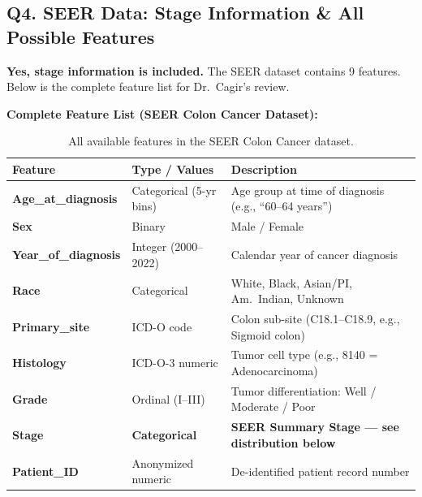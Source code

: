 \documentclass[11pt, a4paper]{article}
\begin{document}
\vspace{6pt}

\subsection*{Q4. SEER Data: Stage Information \& All Possible Features}
\begin{answerbox}
\textbf{Yes, stage information is included.} The SEER dataset contains 9 features. Below is the complete feature list for Dr.\ Cagir's review.
\end{answerbox}

\vspace{6pt}
\noindent\textbf{Complete Feature List (SEER Colon Cancer Dataset):}
\vspace{4pt}

\begin{table}[H]
\centering
\renewcommand{\arraystretch}{1.3}
\begin{tabular}{>{\bfseries}p{4.5cm} p{4.5cm} p{5.5cm}}
\toprule
\textbf{Feature} & \textbf{Type / Values} & \textbf{Description} \\
\midrule
Age\_at\_diagnosis    & Categorical (5-yr bins) & Age group at time of diagnosis (e.g., ``60--64 years'') \\
Sex                   & Binary                  & Male / Female \\
Year\_of\_diagnosis   & Integer (2000--2022)     & Calendar year of cancer diagnosis \\
Race                  & Categorical             & White, Black, Asian/PI, Am.\ Indian, Unknown \\
Primary\_site         & ICD-O code              & Colon sub-site (C18.1--C18.9, e.g., Sigmoid colon) \\
Histology             & ICD-O-3 numeric         & Tumor cell type (e.g., 8140 = Adenocarcinoma) \\
Grade                 & Ordinal (I--III)        & Tumor differentiation: Well / Moderate / Poor \\
\rowcolor{lightgray}
\textbf{Stage}        & \textbf{Categorical}    & \textbf{SEER Summary Stage --- see distribution below} \\
Patient\_ID           & Anonymized numeric      & De-identified patient record number \\
\bottomrule
\end{tabular}
\caption{All available features in the SEER Colon Cancer dataset.}
\end{table}
\end{document}
